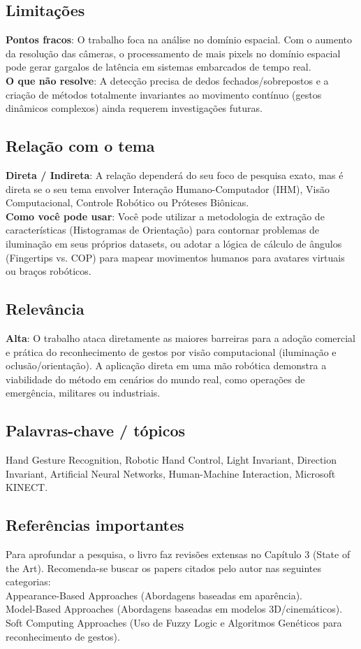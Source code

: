 \documentclass[12pt, a4paper]{article}
\begin{document}
\subsection{Limitações}
\textbf{Pontos fracos}: O trabalho foca na análise no domínio espacial. Com o aumento da resolução das câmeras, o processamento de mais pixels no domínio espacial pode gerar gargalos de latência em sistemas embarcados de tempo real.\\
\textbf{O que não resolve}: A detecção precisa de dedos fechados/sobrepostos e a criação de métodos totalmente invariantes ao movimento contínuo (gestos dinâmicos complexos) ainda requerem investigações futuras.\\
\subsection{Relação com o tema}
\textbf{Direta / Indireta}: A relação dependerá do seu foco de pesquisa exato, mas é direta se o seu tema envolver Interação Humano-Computador (IHM), Visão Computacional, Controle Robótico ou Próteses Biônicas.\\
\textbf{Como você pode usar}: Você pode utilizar a metodologia de extração de características (Histogramas de Orientação) para contornar problemas de iluminação em seus próprios datasets, ou adotar a lógica de cálculo de ângulos (Fingertips vs. COP) para mapear movimentos humanos para avatares virtuais ou braços robóticos.\\
\subsection{Relevância}
\textbf{Alta}: O trabalho ataca diretamente as maiores barreiras para a adoção comercial e prática do reconhecimento de gestos por visão computacional (iluminação e oclusão/orientação). A aplicação direta em uma mão robótica demonstra a viabilidade do método em cenários do mundo real, como operações de emergência, militares ou industriais.\\
\subsection{Palavras-chave / tópicos}
Hand Gesture Recognition, Robotic Hand Control, Light Invariant, Direction Invariant, Artificial Neural Networks, Human-Machine Interaction, Microsoft KINECT.\\
\subsection{Referências importantes}
Para aprofundar a pesquisa, o livro faz revisões extensas no Capítulo 3 (State of the Art). Recomenda-se buscar os papers citados pelo autor nas seguintes categorias:\\
Appearance-Based Approaches (Abordagens baseadas em aparência).\\
Model-Based Approaches (Abordagens baseadas em modelos 3D/cinemáticos).\\
Soft Computing Approaches (Uso de Fuzzy Logic e Algoritmos Genéticos para reconhecimento de gestos).\\
\newpage
\end{document}
